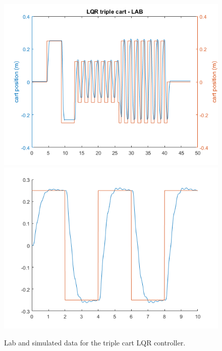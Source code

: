 \documentclass[a4paper,12pt]{article}
\begin{document}
\begin{figure}[h]
\centering
\includegraphics[scale=0.4]{lqr3cart-lab.png}
\includegraphics[scale=0.4]{lqr3cart-sim.png}
\caption{Lab and simulated data for the triple cart LQR controller.}
\end{figure}
\end{document}
